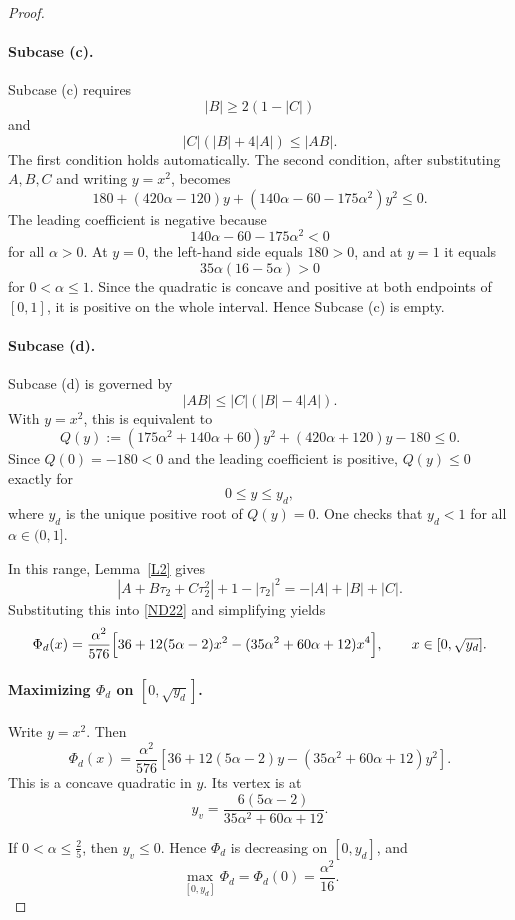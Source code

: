 \documentclass[11pt,reqno]{amsart}
\numberwithin{equation}{section}
\begin{document}
\begin{proof}
\paragraph{Subcase (c).}
Subcase (c) requires
\[
|B|\ge 2(1-|C|)
\]
and
\[
|C|(|B|+4|A|)\le |AB|.
\]
The first condition holds automatically. The second condition, after substituting $A,B,C$ and writing $y=x^2$, becomes
\[
180+(420\alpha-120)y+(140\alpha-60-175\alpha^2)y^2\le 0.
\]
The leading coefficient is negative because
\[
140\alpha-60-175\alpha^2<0
\]
for all $\alpha>0$. At $y=0$, the left-hand side equals $180>0$, and at $y=1$ it equals
\[
35\alpha(16-5\alpha)>0
\]
for $0<\alpha\le 1$. Since the quadratic is concave and positive at both endpoints of $[0,1]$, it is positive on the whole interval. Hence Subcase (c) is empty.

\paragraph{Subcase (d).}
Subcase (d) is governed by
\[
|AB|\le |C|(|B|-4|A|).
\]
With $y=x^2$, this is equivalent to
\begin{equation}\label{Qineq}
Q(y):=(175\alpha^2+140\alpha+60)y^2+(420\alpha+120)y-180\le 0.
\end{equation}
Since $Q(0)=-180<0$ and the leading coefficient is positive, $Q(y)\le 0$ exactly for
\[
0\le y\le y_d,
\]
where $y_d$ is the unique positive root of $Q(y)=0$. One checks that $y_d<1$ for all $\alpha\in(0,1]$.

In this range, Lemma~\ref{L2} gives
\[
|A+B\tau_2+C\tau_2^2|+1-|\tau_2|^2
=
-|A|+|B|+|C|.
\]
Substituting this into \eqref{ND22} and simplifying yields
\begin{equation}\label{phi_d}
\Phi_d(x)
=
\frac{\alpha^2}{576}
\Bigl[
36+12(5\alpha-2)x^2-(35\alpha^2+60\alpha+12)x^4
\Bigr],
\qquad x\in[0,\sqrt{y_d}].
\end{equation}

\paragraph{Maximizing $\Phi_d$ on $[0,\sqrt{y_d}]$.}
Write $y=x^2$. Then
\[
\Phi_d(x)
=
\frac{\alpha^2}{576}
\left[
36+12(5\alpha-2)y-(35\alpha^2+60\alpha+12)y^2
\right].
\]
This is a concave quadratic in $y$. Its vertex is at
\[
y_v=\frac{6(5\alpha-2)}{35\alpha^2+60\alpha+12}.
\]

If $0<\alpha\le \frac25$, then $y_v\le 0$. Hence $\Phi_d$ is decreasing on $[0,y_d]$, and
\[
\max_{[0,y_d]}\Phi_d=\Phi_d(0)=\frac{\alpha^2}{16}.
\]


\end{proof}
\end{document}
